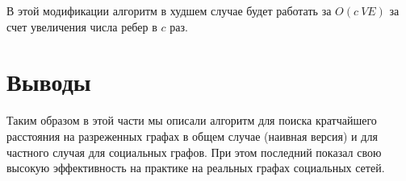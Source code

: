 В этой модификации алгоритм в худшем случае будет работать за $O(c \ VE)$ за счет увеличения числа ребер в $c$ раз.

\FloatBarrier
\section{Выводы}
Таким образом в этой части мы описали алгоритм для поиска кратчайшего расстояния на разреженных графах в общем случае (наивная версия) и для частного случая для социальных графов. При этом последний показал свою высокую эффективность на практике на реальных графах социальных сетей.
\FloatBarrier
